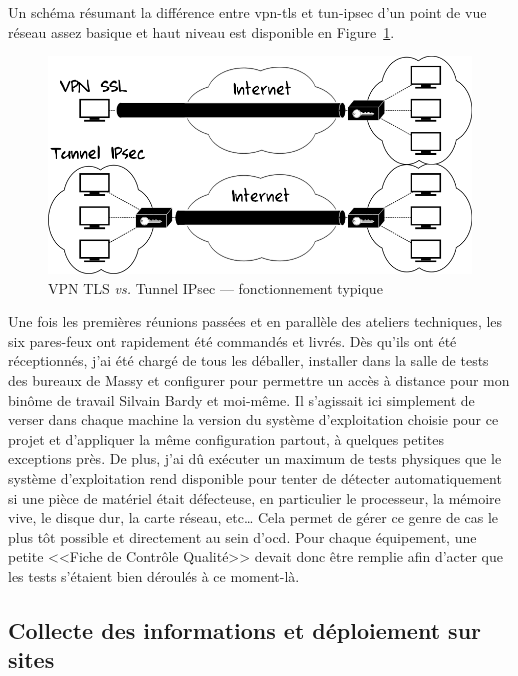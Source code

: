 \documentclass[12pt, oneside, a4paper, titlepage]{report}
\begin{document}
Un schéma résumant la différence entre \gls{vpn-tls} et \gls{tun-ipsec} d'un
point de vue réseau assez basique et haut niveau est disponible en
Figure~\ref{fig:misc/tls-vs-ipsec}.

\begin{figure}[h!]
    \centering
    \includegraphics[width = 0.8\linewidth]{img/misc/tls-vs-ipsec.png}
    \caption{VPN TLS \textit{vs.} Tunnel IPsec --- fonctionnement typique}%
    \label{fig:misc/tls-vs-ipsec}
\end{figure}

Une fois les premières réunions passées et en parallèle des ateliers techniques,
les six pares-feux ont rapidement été commandés et livrés. Dès qu'ils ont été
réceptionnés, j'ai été chargé de tous les déballer, installer dans la salle de
tests des bureaux de Massy et configurer pour permettre un accès à distance pour
mon binôme de travail Silvain Bardy et moi-même. Il s'agissait ici simplement de
verser dans chaque machine la version du système d'exploitation choisie pour ce
projet et d'appliquer la même configuration partout, à quelques petites
exceptions près. De plus, j'ai dû exécuter un maximum de tests physiques que le
système d'exploitation rend disponible pour tenter de détecter automatiquement
si une pièce de matériel était défecteuse, en particulier le processeur, la
mémoire vive, le disque dur, la carte réseau, etc\ldots{} Cela permet de gérer
ce genre de cas le plus tôt possible et directement au sein d'\gls{ocd}. Pour
chaque équipement, une petite <<Fiche de Contrôle Qualité>> devait donc être
remplie afin d'acter que les tests s'étaient bien déroulés à ce moment-là.

\subsection{Collecte des informations et déploiement sur sites}%
\label{sub:mission::main::collec}
\end{document}
